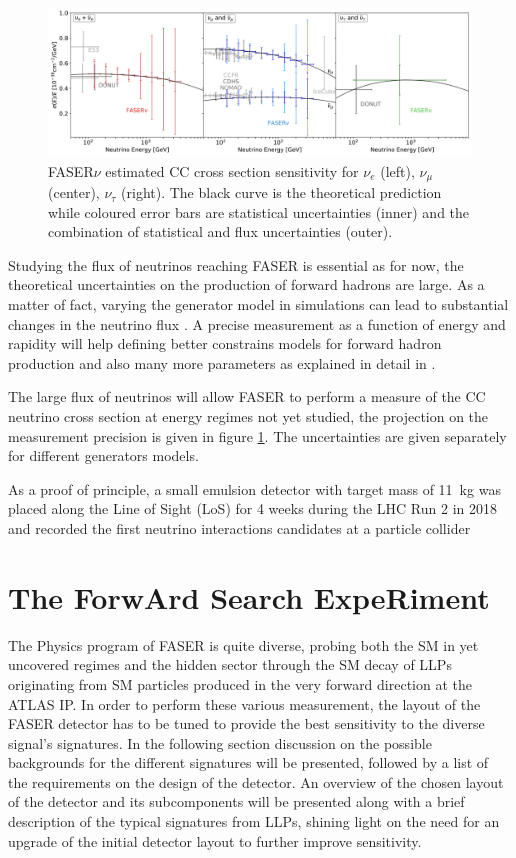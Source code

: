 		\begin{figure}[h]
			\centering
			\includegraphics[width=0.845\linewidth]{files/neutrino_XS}
			\caption{FASER$\nu$ estimated CC cross section sensitivity for $\nu_e$ (left), $\nu_\mu$ (center), $\nu_\tau$ (right). The black curve is the theoretical prediction while coloured error bars are statistical uncertainties (inner) and the combination of statistical and flux uncertainties (outer).}
			\label{im:neutrino_XS}
		\end{figure}
		\clearpage
		
		Studying the flux of neutrinos reaching FASER is essential as for now, the theoretical uncertainties on the production of forward hadrons are large. As a matter of fact, varying the generator model in simulations can lead to substantial changes in the neutrino flux \cite{FASER_Detector}. A precise measurement as a function of energy and rapidity will help defining better constrains models for forward hadron production and also many more parameters as explained in detail in \cite{FASER_Detector}.  
		
		The large flux of neutrinos will allow FASER to perform a measure of the CC neutrino cross section at energy regimes not yet studied, the projection on the measurement precision is given in figure \ref{im:neutrino_XS}. The uncertainties are given separately for different generators models. 
		
		As a proof of principle, a small emulsion detector with target mass of \SI{11}{\kilo\gram} was placed along the Line of Sight (LoS) for 4 weeks during the LHC Run 2 in 2018 and recorded the first neutrino interactions candidates at a particle collider \cite{neutrino_pop}
	\clearpage
	
	
	
	\section{The ForwArd Search ExpeRiment}
	 The Physics program of FASER is quite diverse, probing both the SM in yet uncovered regimes and the hidden sector through the SM decay of LLPs originating from SM particles produced in the very forward direction at the ATLAS IP. In order to perform these various measurement, the layout of the FASER detector has to be tuned to provide the best sensitivity to the diverse signal's signatures. 
	 In the following section discussion on the possible backgrounds for the different signatures will be presented, followed by a list of the requirements on the design of the detector. An overview of the chosen layout of the detector and its subcomponents will be presented along with a brief description of the typical signatures from LLPs, shining light on the need for an upgrade of the initial detector layout to further improve sensitivity.   
	
